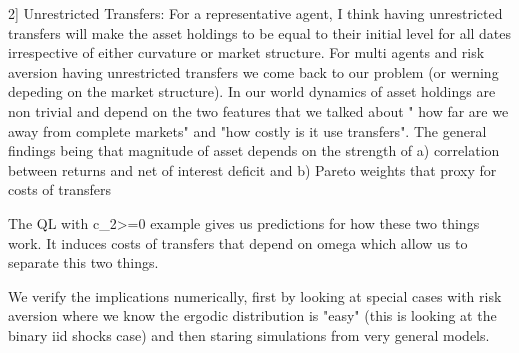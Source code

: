 2] Unrestricted Transfers: For a representative agent, I think having unrestricted transfers will make the asset holdings to be equal to their initial level for all dates irrespective of either curvature or market structure. For multi agents and risk aversion having unrestricted transfers we come back to our problem (or werning depeding on the market structure). In our world dynamics of asset holdings are non trivial and depend on the two features that we talked about " how far are we away from complete markets" and "how costly is it use transfers". The general findings being that magnitude of asset depends on the strength of a) correlation between returns and net of interest deficit and b) Pareto weights that proxy for costs of transfers

The QL with c_2>=0 example gives us predictions for how these two things work. It induces costs of transfers that depend on omega which allow us to separate this two things.

We verify the implications numerically, first by looking at special cases with risk aversion where we know the ergodic distribution is "easy" (this is looking at the binary iid shocks case) and then staring simulations from very general models.
